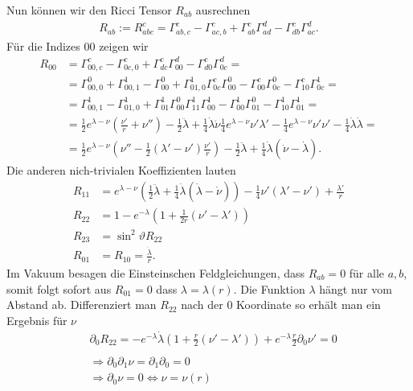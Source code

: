 \documentclass[a4paper]{article}
\begin{document}
Nun können wir den Ricci Tensor $R_{ab}$ ausrechnen
\begin{align}
    R_{ab}:=R^c_{abc}  = \Gamma^c_{ab,c}-\Gamma^c_{ac, b} + \Gamma^c_{ab}
    \Gamma^d_{ad} -\Gamma^c_{db}\Gamma^d_{ac}.
\end{align}
Für die Indizes $00$ zeigen wir
\begin{align}
    R_{00} &= \Gamma^c_{00,c} - \Gamma^c_{0c,0}+\Gamma^c_{dc}\Gamma^d_{00} -
    \Gamma^c_{d0}\Gamma^d_{0c} =\\
    &=\Gamma^0_{00,0} + \Gamma^1_{00,1} - \Gamma^0_{00} + \Gamma^1_{01,0}
    \Gamma^c_{0c}\Gamma^{0}_{00} - \Gamma^c_{00}\Gamma^0_{0c} - \Gamma^c_{10}
    \Gamma^1_{0c} =\\
    &= \Gamma^1_{00,1} - \Gamma^1_{01,0} + \Gamma^1_{01}\Gamma^0_{00}
    \Gamma^1_{11}\Gamma^1_{00} - \Gamma^1_{00}\Gamma^0_{01} - \Gamma^1_{10}
    \Gamma^1_{01} = \\
    &=\frac{1}{2}e^{\lambda-\nu}(\frac{\nu'}{r} + \nu'')
    -\frac{1}{2}\ddot{\lambda} + \frac{1}{4} \dot{\lambda}\dot{\nu}
    \frac{1}{4}e^{\lambda-\nu} \nu'\lambda' - \frac{1}{4}e^{\lambda-\nu}
    \nu'\nu' - \frac{1}{4} \dot{\lambda}\dot{\lambda} = \\
    &=\frac{1}{2} e^{\lambda -\nu} ( \nu'' -\frac{1}{2}(\lambda' - \nu')
    \frac{\nu'}{r}) -\frac{1}{2} \ddot{\lambda} + \frac{1}{4}\dot{\lambda}(
    \dot{\nu} - \dot{\lambda}).
\end{align}
Die anderen nich-trivialen Koeffizienten lauten
\begin{align}
    R_{11} &= e^{\lambda-\nu}
    (\frac{1}{2}\ddot{\lambda}+\frac{1}{4}\dot{\lambda}(\dot{\lambda}-
    \dot{\nu}))
    -\frac{1}{4} \nu'(\lambda' - \nu') + \frac{\lambda'}{r}\\
    R_{22} &= 1-e^{-\lambda}(1+\frac{1}{2r} (\nu'-\lambda'))\\
    R_{23} &= \sin^2\vartheta R_{22}\\
    R_{01} &= R_{10} = \frac{\dot{\lambda}}{r}.
\end{align}
Im Vakuum besagen die Einsteinschen Feldgleichungen, dass $R_{ab} = 0$ für
alle $a, b$, somit folgt sofort aus $R_{01} = 0$ dass $\lambda = \lambda(r)$.
Die Funktion $\lambda$ hängt nur vom Abstand ab. Differenziert man $R_{22}$
nach der $0$ Koordinate so erhält man ein Ergebnis für $\nu$
\begin{align}
    &\partial_0 R_{22} = -e^{-\lambda} \dot{\lambda} ( 1+ \frac{r}{2}(\nu' -
    \lambda')) + e^{-\lambda} \frac{r}{2}\partial_0 \nu' = 0\\
    \nonumber\\
    &\Rightarrow \partial_0\partial_1 \nu = \partial_1\partial_0 = 0\\
    &\Rightarrow \partial_0 \nu =0 \Leftrightarrow \nu = \nu(r)
\end{align}
\end{document}

